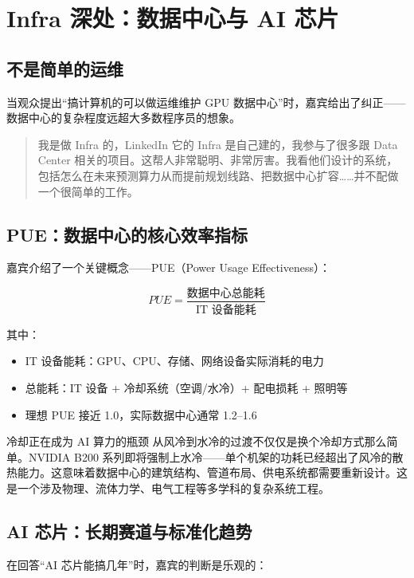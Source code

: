 \documentclass[a4paper]{article}
\begin{document}
\section{Infra 深处：数据中心与 AI 芯片}

\subsection{不是简单的运维}

当观众提出``搞计算机的可以做运维维护 GPU 数据中心''时，嘉宾给出了纠正——数据中心的复杂程度远超大多数程序员的想象。

\begin{quote}
我是做 Infra 的，LinkedIn 它的 Infra 是自己建的，我参与了很多跟 Data Center 相关的项目。这帮人非常聪明、非常厉害。我看他们设计的系统，包括怎么在未来预测算力从而提前规划线路、把数据中心扩容……并不配做一个很简单的工作。
\end{quote}

\subsection{PUE：数据中心的核心效率指标}

嘉宾介绍了一个关键概念——PUE（Power Usage Effectiveness）：

$$
PUE = \frac{\text{数据中心总能耗}}{\text{IT 设备能耗}}
$$

其中：
\begin{itemize}
    \item IT 设备能耗：GPU、CPU、存储、网络设备实际消耗的电力
    \item 总能耗：IT 设备 + 冷却系统（空调/水冷）+ 配电损耗 + 照明等
    \item 理想 PUE 接近 1.0，实际数据中心通常 1.2--1.6
\end{itemize}

\begin{importantbox}{冷却正在成为 AI 算力的瓶颈}
从风冷到水冷的过渡不仅仅是换个冷却方式那么简单。NVIDIA B200 系列即将强制上水冷——单个机架的功耗已经超出了风冷的散热能力。这意味着数据中心的建筑结构、管道布局、供电系统都需要重新设计。这是一个涉及物理、流体力学、电气工程等多学科的复杂系统工程。
\end{importantbox}

\subsection{AI 芯片：长期赛道与标准化趋势}

在回答``AI 芯片能搞几年''时，嘉宾的判断是乐观的：
\end{document}
